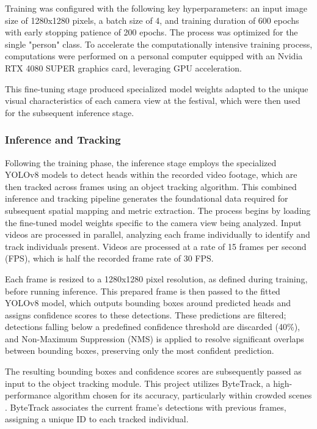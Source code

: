 Training was configured with the following key hyperparameters: an input image size of 1280x1280 pixels, a batch size of 4, and training duration of 600 epochs with early stopping patience of 200 epochs. The process was optimized for the single "person" class. To accelerate the computationally intensive training process, computations were performed on a personal computer equipped with an Nvidia RTX 4080 SUPER graphics card, leveraging GPU acceleration.

This fine-tuning stage produced specialized model weights adapted to the unique visual characteristics of each camera view at the festival, which were then used for the subsequent inference stage.

\subsubsection{Inference and Tracking}
Following the training phase, the inference stage employs the specialized YOLOv8 models to detect heads within the recorded video footage, which are then tracked across frames using an object tracking algorithm. This combined inference and tracking pipeline generates the foundational data required for subsequent spatial mapping and metric extraction. The process begins by loading the fine-tuned model weights specific to the camera view being analyzed. Input videos are processed in parallel, analyzing each frame individually to identify and track individuals present. Videos are processed at a rate of 15 frames per second (FPS), which is half the recorded frame rate of 30 FPS.

Each frame is resized to a 1280x1280 pixel resolution, as defined during training, before running inference. This prepared frame is then passed to the fitted YOLOv8 model, which outputs bounding boxes around predicted heads and assigns confidence scores to these detections. These predictions are filtered; detections falling below a predefined confidence threshold are discarded (40\%), and Non-Maximum Suppression (NMS) is applied to resolve significant overlaps between bounding boxes, preserving only the most confident prediction.

The resulting bounding boxes and confidence scores are subsequently passed as input to the object tracking module. This project utilizes ByteTrack, a high-performance algorithm chosen for its accuracy, particularly within crowded scenes \cite{bytetrack}. ByteTrack associates the current frame's detections with previous frames, assigning a unique ID to each tracked individual.

